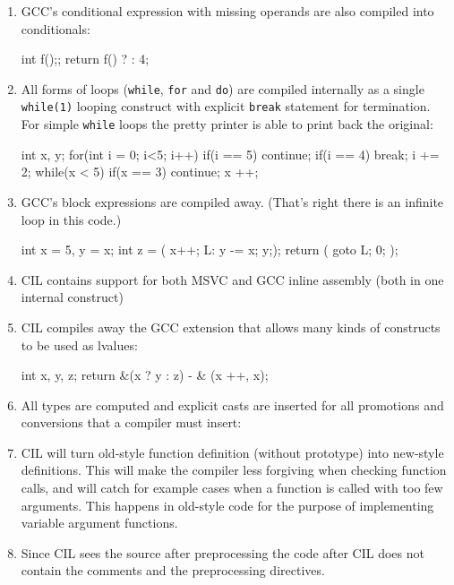 \documentclass{article}
\def\t#1{{\tt #1}}
\begin{document}
\begin{enumerate}
\item GCC's conditional expression with missing operands are also compiled
into conditionals:
\begin{cilcode}[local]
  int f();;
  return f() ? : 4;
\end{cilcode}

\item All forms of loops (\t{while}, \t{for} and \t{do}) are compiled
internally as a single \t{while(1)} looping construct with explicit \t{break}
statement for termination. For simple \t{while} loops the pretty printer is
able to print back the original:
\begin{cilcode}[local]
   int x, y;
   for(int i = 0; i<5; i++) {
      if(i == 5) continue;
      if(i == 4) break;
      i += 2;
   } 
   while(x < 5) {
     if(x == 3) continue;
     x ++;
   }
\end{cilcode}

\item GCC's block expressions are compiled away. (That's right there is an
infinite loop in this code.)

\begin{cilcode}[local]
   int x = 5, y = x;
   int z = ({ x++; L: y -= x; y;});
   return ({ goto L; 0; });
\end{cilcode}

\item CIL contains support for both MSVC and GCC inline assembly (both in one
internal construct)

\item CIL compiles away the GCC extension that allows many kinds of constructs
to be used as lvalues:

\begin{cilcode}[local]
   int x, y, z;
   return &(x ? y : z) - & (x ++, x);
\end{cilcode}

\item All types are computed and explicit casts are inserted for all
promotions and conversions that a compiler must insert:

\item CIL will turn old-style function definition (without prototype) into
new-style definitions. This will make the compiler less forgiving when
checking function calls, and will catch for example cases when a function is
called with too few arguments. This happens in old-style code for the purpose
of implementing variable argument functions.
 
\item Since CIL sees the source after preprocessing the code after CIL does
not contain the comments and the preprocessing directives.


\end{enumerate}
\end{document}
